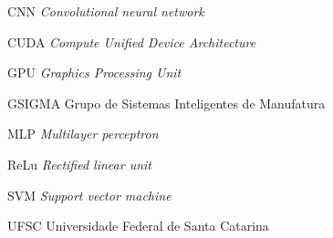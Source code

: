 
\begin{siglas}
    \item[CNN] \textit{Convolutional neural network}
    \item[CUDA] \textit{Compute Unified Device Architecture}
    \item[GPU] \textit{Graphics Processing Unit}
    \item[GSIGMA] Grupo de Sistemas Inteligentes de Manufatura
    \item[MLP] \textit{Multilayer perceptron}
    \item[ReLu] \textit{Rectified linear unit}
    \item[SVM] \textit{Support vector machine}
    \item[UFSC] Universidade Federal de Santa Catarina
\end{siglas}


